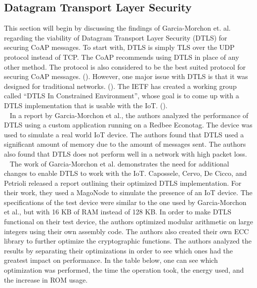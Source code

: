 \documentclass[letterpaper, 12pt]{article}
\begin{document}
\begin{flushleft}
\subsection*{Datagram Transport Layer Security}
This section will begin by discussing the findings of Garcia-Morchon et. al. regarding the viability of Datagram Transport Layer Security (DTLS)
for securing CoAP messages. To start with, DTLS is simply TLS over the UDP protocol instead of TCP. The CoAP recommends using DTLS in place of any
other method. The protocol is also considered to be the best suited protocol for securing CoAP messages. (\cite{Keoh6817545}). However, one major issue with DTLS is that it was designed for traditional networks. (\cite{Capossele}). 
The IETF has created a working group called ``DTLS In Constrained Environment'', whose goal is to 
come up with a DTLS implementation that is usable with the IoT. (\cite{Keoh6817545}). \\
~\newline
In a report by Garcia-Morchon et al., the authors analyzed the performance of DTLS using a custom application running on a Redbee Econotag. The device
was used to simulate a real world IoT device. The authors found that DTLS used a significant amount of memory due to the amount of messages sent. 
The authors also found that DTLS does not perform well in a network with high packet loss. \\
~\newline
The work of Garcia-Morchon et al. demonstrates the need for additional changes to enable DTLS to work with the IoT. 
Capossele, Cervo, De Cicco,
and Petrioli released a report outlining their optimized DTLS implementation. For their work, they used a MagoNode to simulate the presence of an
IoT device. The specifications of the test device were similar to the one used by Garcia-Morchon et al., but with 16 KB of RAM instead of 128 KB.
In order to make DTLS functional on their test device, the authors optimized modular arithmetic on large integers using their own assembly code.
The authors also created their own ECC library to further optimize the cryptographic functions. The authors analyzed the results by separating their
optimizations in order to see which ones had the greatest impact on performance. In the table below, one can see which optimization was performed,
the time the operation took, the energy used, and the increase in ROM usage. 


\end{flushleft}
\end{document}
